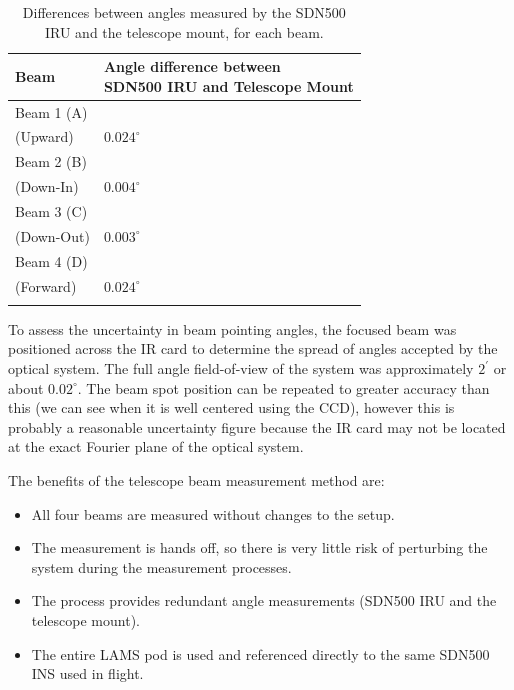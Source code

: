 \documentclass[12pt,twoside,english]{article}\usepackage[]{graphicx}\usepackage[]{color}
\providecommand{\tabularnewline}{\\}
\let\OrgIndex\index
\renewcommand*{\index}[1]{\OrgIndex{#1}}
\begin{document}
\begin{table}
\begin{minipage}[t]{0.93\columnwidth}%
\noindent \begin{center}
\begin{tabular}{>{\centering}p{2.5cm}>{\centering}p{7cm}}
\toprule 
\textbf{Beam}  &
\textbf{Angle difference between \\
SDN500 IRU and Telescope Mount}
\tabularnewline
\midrule
\midrule 
Beam 1 (A) &
\tabularnewline
(Upward)  &
$0.024^{\circ}$ \tabularnewline
\midrule 
Beam 2 (B) &
\tabularnewline
(Down-In)  &
$0.004^{\circ}$ \tabularnewline
\midrule 
Beam 3 (C) &
\tabularnewline
(Down-Out)  &
$0.003^{\circ}$ \tabularnewline
\midrule 
Beam 4 (D) &
\tabularnewline
(Forward)  &
$0.024^{\circ}$ \tabularnewline
\midrule 
  &
\tabularnewline
\end{tabular}
\par\end{center}%
\end{minipage}
\protect\caption{Differences between angles measured by the SDN500 IRU and the telescope mount, for each beam.\label{tab:AngleDiff}}
\end{table}

To assess the uncertainty in beam pointing angles, the focused beam was positioned across the IR card to determine the spread of angles accepted by the optical system. The full angle field-of-view of the system was approximately $2^{\prime}$ or about $0.02^{\circ}$. The beam spot position can be repeated to greater accuracy than this (we can see when it is well centered using the CCD), however this is probably a reasonable uncertainty figure because the IR card may not be located at the exact Fourier plane of the optical system.  

The benefits of the telescope beam measurement method are:  
\begin{itemize}
\item All four beams are measured without changes to the setup. 

\item The measurement is \textquotedbl{}hands off\textquotedbl{}, so there is very little risk of perturbing the system during the measurement processes. 

\item The process provides redundant angle measurements (SDN500 IRU and the telescope mount). 

\item The entire LAMS pod is used and referenced directly to the same SDN500 INS used in flight.  
\end{itemize}
\end{document}
